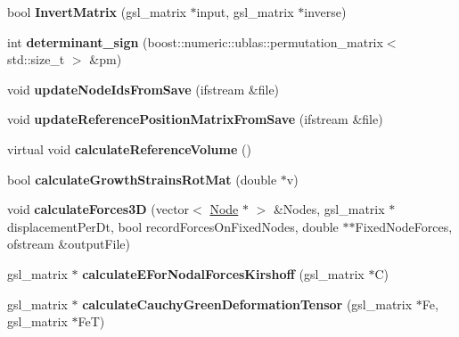 \begin{DoxyCompactItemize}
\item 
\hypertarget{classShapeBase_ab0a890c07a2fa8ac45fa50bdbfe6b0d9}{}bool {\bfseries Invert\+Matrix} (gsl\+\_\+matrix $\ast$input, gsl\+\_\+matrix $\ast$inverse)\label{classShapeBase_ab0a890c07a2fa8ac45fa50bdbfe6b0d9}

\item 
\hypertarget{classShapeBase_a82fc62813dedf48bf3074206a26c3dfd}{}int {\bfseries determinant\+\_\+sign} (boost\+::numeric\+::ublas\+::permutation\+\_\+matrix$<$ std\+::size\+\_\+t $>$ \&pm)\label{classShapeBase_a82fc62813dedf48bf3074206a26c3dfd}

\item 
\hypertarget{classShapeBase_ac4c46ba7c9b89a208fafb419097494a5}{}void {\bfseries update\+Node\+Ids\+From\+Save} (ifstream \&file)\label{classShapeBase_ac4c46ba7c9b89a208fafb419097494a5}

\item 
\hypertarget{classShapeBase_a4b5cade90773535353e9b7c4da3463ae}{}void {\bfseries update\+Reference\+Position\+Matrix\+From\+Save} (ifstream \&file)\label{classShapeBase_a4b5cade90773535353e9b7c4da3463ae}

\item 
\hypertarget{classShapeBase_a39adc8589779388b57622489f370f445}{}virtual void {\bfseries calculate\+Reference\+Volume} ()\label{classShapeBase_a39adc8589779388b57622489f370f445}

\item 
\hypertarget{classShapeBase_a8bf9c7c8ae6a3195ec9c6b6bdaf847ab}{}bool {\bfseries calculate\+Growth\+Strains\+Rot\+Mat} (double $\ast$v)\label{classShapeBase_a8bf9c7c8ae6a3195ec9c6b6bdaf847ab}

\item 
\hypertarget{classShapeBase_adb3406309c4c0d5ba20cb637ceca6856}{}void {\bfseries calculate\+Forces3\+D} (vector$<$ \hyperlink{classNode}{Node} $\ast$ $>$ \&Nodes, gsl\+\_\+matrix $\ast$displacement\+Per\+Dt, bool record\+Forces\+On\+Fixed\+Nodes, double $\ast$$\ast$Fixed\+Node\+Forces, ofstream \&output\+File)\label{classShapeBase_adb3406309c4c0d5ba20cb637ceca6856}

\item 
\hypertarget{classShapeBase_a347fb2687678294a252a12820842cb0d}{}gsl\+\_\+matrix $\ast$ {\bfseries calculate\+E\+For\+Nodal\+Forces\+Kirshoff} (gsl\+\_\+matrix $\ast$C)\label{classShapeBase_a347fb2687678294a252a12820842cb0d}

\item 
\hypertarget{classShapeBase_a2357b6ab477eceb874b627d5d8894eb9}{}gsl\+\_\+matrix $\ast$ {\bfseries calculate\+Cauchy\+Green\+Deformation\+Tensor} (gsl\+\_\+matrix $\ast$Fe, gsl\+\_\+matrix $\ast$Fe\+T)\label{classShapeBase_a2357b6ab477eceb874b627d5d8894eb9}


\end{DoxyCompactItemize}
